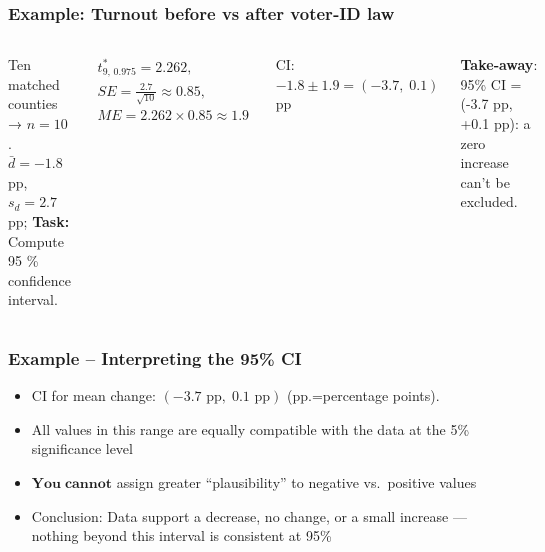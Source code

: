 \documentclass[handout]{beamer}
\begin{document}
\begin{frame}
\frametitle{Example: Turnout before vs after voter‑ID law}
\begin{columns}[T]
  \small
  Ten matched counties → \(n=10\).
  \(\bar d=-1.8\) pp, \(s_d=2.7\) pp; \textbf{Task:} Compute 95 \% confidence interval.
  \pause

  \begin{align*}
      t^{\ast}_{9,\,0.975}=2.262, \\
      SE = \frac{2.7}{\sqrt{10}}\approx0.85, \\
      ME = 2.262\times0.85\approx1.9
  \end{align*}

  CI:\; \(-1.8\pm1.9 = (-3.7,\;0.1)\) pp

  \vspace{1ex}
  \textbf{Take‑away}: 95\% CI = (-3.7 pp, +0.1 pp): a zero increase can’t be excluded.

  \includegraphics[width=\textwidth]{Figures/paired_diff.pdf}
\end{columns}
\end{frame}

\begin{frame}
\frametitle{Example -- Interpreting the 95\% CI}
\begin{itemize}
  \item CI for mean change: \((-3.7 \text{ pp},\;0.1 \text{ pp})\)  (pp.=percentage points).
  \item All values in this range are equally compatible with the data at the 5\% significance level
  \item \(\mathbf{You\;cannot}\) assign greater ``plausibility” to negative vs.\ positive values
  \item Conclusion: Data support a decrease, no change, or a small increase — nothing beyond this interval is consistent at 95\%
\end{itemize}
\end{frame}
\end{document}
